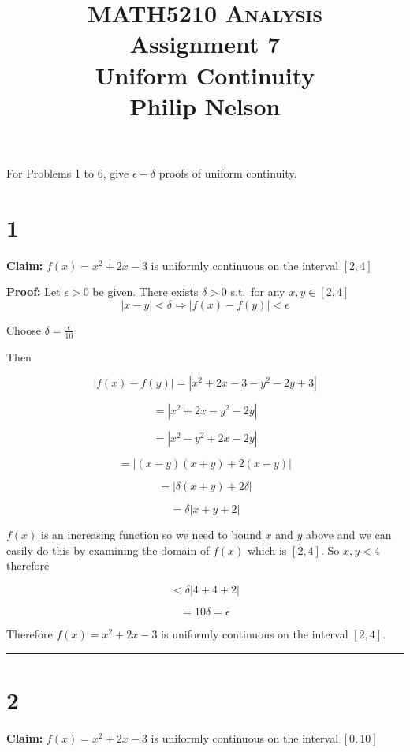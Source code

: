 \documentclass[10pt,letterpaper]{article}
\newcommand\qedsym{\hfill \rule{2mm}{2mm}}
\begin{document}
\title{MATH5210 \textsc{Analysis}
  \\ Assignment 7
  \\ Uniform Continuity
  \\ Philip Nelson
}

\date{}

\maketitle
For Problems 1 to 6, give $\epsilon - \delta$ proofs of uniform continuity.
\section*{1}

\textbf{Claim:} $f(x) = x^2 + 2x -3$ is uniformly continuous on the interval $[2,4]$

\medskip

\textbf{Proof:} Let $\epsilon > 0$ be given. There exists $\delta > 0$ s.t.\ for any $x, y \in [2,4]$ \[|x-y| < \delta \Rightarrow |f(x) - f(y)| < \epsilon\]

Choose $\delta = \frac{\epsilon}{10}$

Then

\[|f(x)-f(y)| = |x^2 + 2x - 3 - y^2 - 2y + 3|\]

\[= |x^2 + 2x - y^2 - 2y|\]

\[= |x^2 - y^2 + 2x - 2y|\]

\[= |(x-y)(x+y) + 2(x-y)|\]

\[= |\delta(x+y) + 2\delta|\]

\[= \delta|x + y + 2|\]

$f(x)$ is an increasing function so we need to bound $x$ and $y$ above and we can easily do this by examining the domain of $f(x)$ which is $[2,4]$. So $x,y < 4$ therefore

\[<\delta|4+4+2|\]

\[=10\delta = \epsilon\]

Therefore $f(x) = x^2 + 2x -3$ is uniformly continuous on the interval $[2,4]$.

\qedsym

\section*{2}

\textbf{Claim:} $f(x) = x^2 + 2x -3$ is uniformly continuous on the interval $[0,10]$

\medskip
\end{document}
